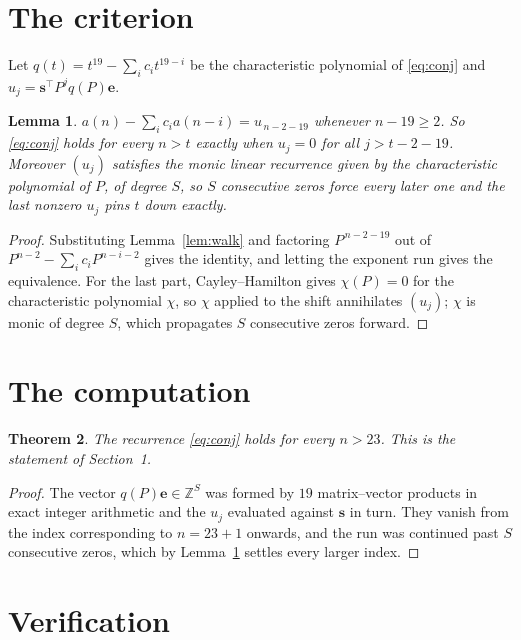 \documentclass[11pt,a4paper]{article}
\theoremstyle{plain}
\newtheorem{theorem}{Theorem}
\newtheorem{lemma}[theorem]{Lemma}
\theoremstyle{definition}
\begin{document}
\section{The criterion}

Let $q(t)=t^{19}-\sum_i c_i t^{19-i}$ be the characteristic polynomial of
\eqref{eq:conj} and $u_j=\mathbf{s}^{\!\top}P^{j}q(P)\mathbf{e}$.

\begin{lemma}\label{lem:crit}
$a(n)-\sum_i c_i a(n-i)=u_{\,n-2-19}$ whenever $n-19\ge2$. So \eqref{eq:conj}
holds for every $n>t$ exactly when $u_j=0$ for all $j>t-2-19$. Moreover $(u_j)$
satisfies the monic linear recurrence given by the characteristic polynomial of $P$, of
degree $S$, so $S$ consecutive zeros force every later one and the last nonzero $u_j$ pins
$t$ down exactly.
\end{lemma}

\begin{proof}
Substituting Lemma~\ref{lem:walk} and factoring $P^{\,n-2-19}$ out of
$P^{n-2}-\sum_i c_i P^{n-i-2}$ gives the identity, and letting the exponent run gives the
equivalence. For the last part, Cayley--Hamilton gives $\chi(P)=0$ for the characteristic
polynomial $\chi$, so $\chi$ applied to the shift annihilates $(u_j)$; $\chi$ is monic of
degree $S$, which propagates $S$ consecutive zeros forward.
\end{proof}

\section{The computation}

\begin{theorem}
The recurrence \eqref{eq:conj} holds for every $n>23$. This is the statement of
Section~1.
\end{theorem}

\begin{proof}
The vector $q(P)\mathbf{e}\in\mathbb{Z}^{S}$ was formed by $19$ matrix--vector
products in exact integer arithmetic and the $u_j$ evaluated against $\mathbf{s}$ in turn.
They vanish from the index corresponding to $n=23+1$ onwards, and the run was continued
past $S$ consecutive zeros, which by Lemma~\ref{lem:crit} settles every larger index.
\end{proof}

\section{Verification}
\end{document}
